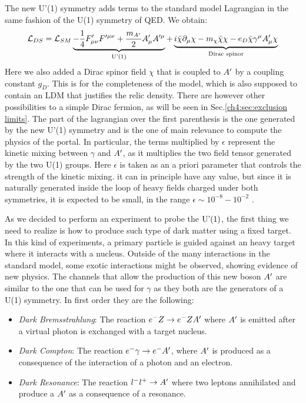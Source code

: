 The new U'(1) symmetry adds terms to the standard model Lagrangian in the same fashion of the U(1) symmetry of QED. We obtain:
\begin{equation}
  \label{eq:dm-lagrangian}
  \mathcal{L}_{DS} = \mathcal{L}_{SM} \underbrace{- \frac{1}{4}F'_{\mu \nu}F'^{\mu \nu} + \frac{m_{A'}}{2}A'_{\mu}A'^{\mu}}_{\textrm{U'(1)}} + \underbrace{i \bar{\chi} \partial_{\mu} \chi - m_{\chi}\bar{\chi}\chi - e_D \bar{\chi}\gamma^{\mu}A'_{\mu}\chi}_{\textrm{Dirac spinor}}
\end{equation}
Here we also added a Dirac spinor field $\chi$ that is coupled to $A'$ by a coupling constant $g_D$. This is for the completeness of the model, which is also supposed to contain an LDM that justifies the relic density. There are however other possibilities to a simple Dirac fermion, as will be seen in Sec.\ref{ch4:sec:exclusion limits}. The part of the lagrangian over the first parenthesis is the one generated by the new U'(1) symmetry and is the one of main relevance to compute the physics of the portal. In particular, the terms multiplied by $\epsilon$ represent the kinetic mixing between $\gamma$ and $A'$, as it multiplies the two field tensor generated by the two U(1) groups. Here $\epsilon$ is taken as an a priori parameter that controls the strength of the kinetic mixing. it can in principle have any value, but since it is naturally generated inside the loop of heavy fields charged under both symmetries, it is expected to be small, in the range $\epsilon \sim 10^{-8} - 10^{-2}$ \cite{jdb}. 

As we decided to perform an experiment to probe the $\textrm{U'(1)}$, the first thing we need to realize is how to produce such type of dark matter using a fixed target. In this kind of experiments, a primary particle is guided against an heavy target where it interacts with a nucleus. Outside of the many interactions in the standard model, some exotic interactions might be observed, showing evidence of new physics. The channels that allow the production of this new boson $A'$ are similar to the one that can be used for $\gamma$ as they both are the generators of a U(1) symmetry. In first order they are the following:

\begin{itemize}
\item \textit{Dark Bremsstrahlung}: The reaction $e^- Z \to e^- Z A'$ where $A'$ is emitted after a virtual photon is exchanged with a target nucleus.
\item \textit{Dark Compton}: The reaction $e^- \gamma \to e^- A'$, where $A'$ is produced as a consequence of the interaction of a photon and an electron.
\item \textit{Dark Resonance}: The reaction $l^- l^+ \to A'$ where two leptons annihilated and produce a $A'$ as a consequence of a resonance.
\end{itemize}

